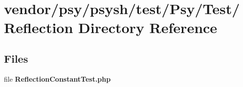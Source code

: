 \section{vendor/psy/psysh/test/\+Psy/\+Test/\+Reflection Directory Reference}
\label{dir_3fa4a4df72d39c3ab9cb46efc75990ca}
\subsection*{Files}
\begin{DoxyCompactItemize}
\item 
file {\bf Reflection\+Constant\+Test.\+php}
\end{DoxyCompactItemize}
